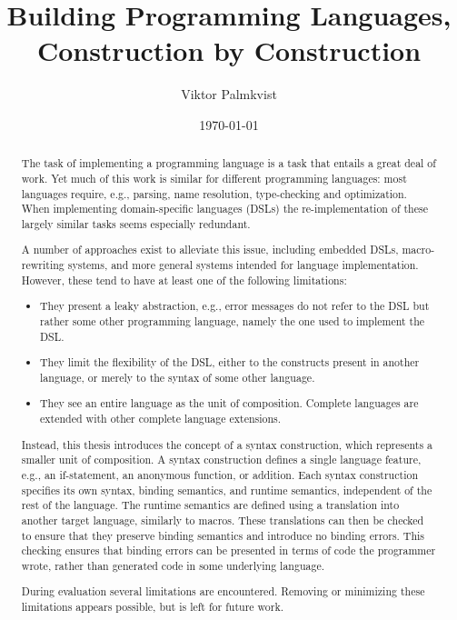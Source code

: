 \documentclass{kththesis}
\title{Building Programming Languages, Construction by Construction}
\author{Viktor Palmkvist}
\date{\today}
\begin{document}
\frontmatter

\titlepage

\begin{abstract}
The task of implementing a programming language is a task that entails a great deal of work. Yet much of this work is similar for different programming languages: most languages require, e.g., parsing, name resolution, type-checking and optimization. When implementing domain-specific languages (DSLs) the re-implementation of these largely similar tasks seems especially redundant.

A number of approaches exist to alleviate this issue, including embedded DSLs, macro-rewriting systems, and more general systems intended for language implementation. However, these tend to have at least one of the following limitations:

\begin{itemize}
  \item They present a leaky abstraction, e.g., error messages do not refer to the DSL but rather some other programming language, namely the one used to implement the DSL.
  \item They limit the flexibility of the DSL, either to the constructs present in another language, or merely to the syntax of some other language.
  \item They see an entire language as the unit of composition. Complete languages are extended with other complete language extensions.
\end{itemize}

Instead, this thesis introduces the concept of a syntax construction, which represents a smaller unit of composition. A syntax construction defines a single language feature, e.g., an if-statement, an anonymous function, or addition. Each syntax construction specifies its own syntax, binding semantics, and runtime semantics, independent of the rest of the language. The runtime semantics are defined using a translation into another target language, similarly to macros. These translations can then be checked to ensure that they preserve binding semantics and introduce no binding errors. This checking ensures that binding errors can be presented in terms of code the programmer wrote, rather than generated code in some underlying language.

\enlargethispage{\baselineskip}

During evaluation several limitations are encountered. Removing or minimizing these limitations appears possible, but is left for future work.
\end{abstract}
\end{document}
